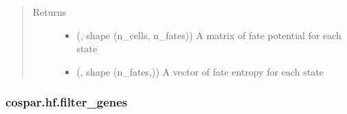\documentclass[letterpaper,10pt,english]{sphinxmanual}
\begin{document}
\begin{fulllineitems}
\begin{quote}
\begin{description}
\begin{description}
\end{description}

\item[{Returns}] \leavevmode
\begin{itemize}
\item {} 
 (, shape (n\_cells, n\_fates)) \textendash{} A matrix of fate potential for each state

\item {} 
 (, shape (n\_fates,)) \textendash{} A vector of fate entropy for each state

\end{itemize}


\end{description}\end{quote}

\end{fulllineitems}



\subsubsection{cospar.hf.filter\_genes}
\label{\detokenize{cospar.hf.filter_genes:cospar-hf-filter-genes}}\label{\detokenize{cospar.hf.filter_genes::doc}}
\end{document}
